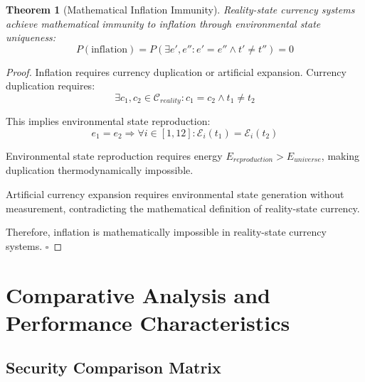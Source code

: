 \documentclass[12pt,a4paper]{article}
\newtheorem{theorem}{Theorem}
\begin{document}
\begin{theorem}[Mathematical Inflation Immunity]
Reality-state currency systems achieve mathematical immunity to inflation through environmental state uniqueness:
\begin{equation}
P(\text{inflation}) = P(\exists e', e'' : e' = e'' \land t' \neq t'') = 0
\end{equation}
\end{theorem}

\begin{proof}
Inflation requires currency duplication or artificial expansion. Currency duplication requires:
\begin{equation}
\exists c_1, c_2 \in \mathcal{C}_{reality} : c_1 = c_2 \land t_1 \neq t_2
\end{equation}

This implies environmental state reproduction:
\begin{equation}
e_1 = e_2 \Rightarrow \forall i \in [1,12] : \mathcal{E}_i(t_1) = \mathcal{E}_i(t_2)
\end{equation}

Environmental state reproduction requires energy $E_{reproduction} > E_{universe}$, making duplication thermodynamically impossible.

Artificial currency expansion requires environmental state generation without measurement, contradicting the mathematical definition of reality-state currency.

Therefore, inflation is mathematically impossible in reality-state currency systems. $\square$
\end{proof}

\section{Comparative Analysis and Performance Characteristics}

\subsection{Security Comparison Matrix}
\end{document}
